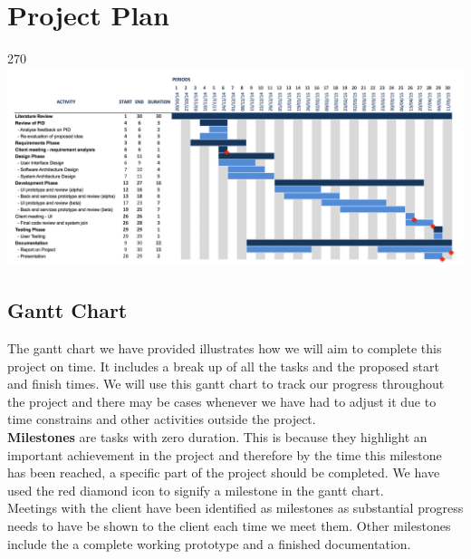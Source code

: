 \section{Project Plan}

\begin{minipage}{\linewidth}
  \hspace*{1.7in}
  \begin{rotate}{270}
    \includegraphics[width=1.28\textwidth]{./img/gantt_chart.png}
    \label{gantt_chart}
  \end{rotate}
\end{minipage}
\clearpage

\subsection{Gantt Chart}
The gantt chart we have provided illustrates how we will aim to complete this project on time.  It includes a break up of all the tasks and the proposed start and finish times.  We will use this gantt chart to track our progress throughout the project and there may be cases whenever we have had to adjust it due to time constrains and other activities outside the project.  \\

\textbf{Milestones} are tasks with zero duration.  This is because they highlight an important achievement in the project and therefore by the time this milestone has been reached, a specific part of the project should be completed.  We have used the red diamond icon to signify a milestone in the gantt chart.  \\
Meetings with the client have been identified as milestones as substantial progress needs to have be shown to the client each time we meet them.  Other milestones include the a complete working prototype and a finished documentation.

